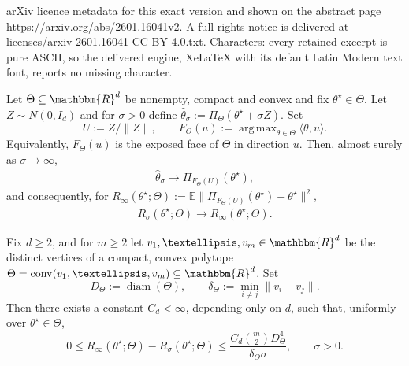 \documentclass[10pt,a4paper]{amsart}
\DeclareMathOperator*{\argmax}{arg\,max}
\newcommand{\E}{\mathbb{E}}
\newcommand{\R}{\mathbbm{R}}
\newcommand{\hattheta}{\hat{\theta}}
\begin{document}
arXiv licence metadata for this exact version and shown on the abstract page https://arxiv.org/abs/2601.16041v2. A full rights notice is delivered at licenses/arxiv-2601.16041-CC-BY-4.0.txt. Characters: every retained excerpt is pure ASCII, so the delivered engine, XeLaTeX with its default Latin Modern text font, reports no missing character.
\begin{theorem}\label{thm:large-sigma-projection}
Let $\Theta\subseteq\R^d$ be nonempty, compact and convex and fix $\theta^\star\in\Theta$.
Let $Z\sim N(0,I_d)$ and for $\sigma>0$ define $\hattheta_\sigma := \Pi_\Theta(\theta^\star+\sigma Z)$. Set
\[
U:=Z/\|Z\|,
\qquad
F_\Theta(u):=\argmax_{\theta\in\Theta}\langle \theta,u\rangle.
\]
Equivalently, $F_\Theta(u)$ is the exposed face of $\Theta$ in direction $u$. 
Then, almost surely as $\sigma\to\infty$,
\begin{align}\label{eq:large-sigma-a.s}
\hattheta_\sigma \to \Pi_{F_\Theta(U)}(\theta^\star),
\end{align}
and consequently, for $R_\infty(\theta^\star; \Theta) := \E\|\Pi_{F_\Theta(U)}(\theta^\star)-\theta^\star\|^2$,
\begin{align}
R_\sigma(\theta^\star; \Theta) \to R_\infty(\theta^\star; \Theta).
\label{eq:large-sigma-risk}
\end{align}
\end{theorem}

\begin{proposition}\label{prop:quant-diverging-noise-polytope}
Fix $d\ge2$, and for $m \ge 2$ let $v_1,\ldots,v_m\in\R^d$ be the distinct vertices of a compact, convex polytope $\Theta=\operatorname{conv}(v_1,\ldots,v_m)\subseteq\R^d$. Set
\[
    D_{\Theta}:=\operatorname{diam}(\Theta),
    \qquad
    \delta_\Theta:=\min_{i\neq j}\|v_i-v_j\|.
\]
Then there exists a constant $C_d<\infty$, depending only on $d$, such that, uniformly over $\theta^\star\in\Theta$,
\[
0
\le
R_\infty(\theta^\star;\Theta)-R_\sigma(\theta^\star;\Theta)
\le
\frac{
    C_d \binom{m}{2}D_\Theta^4
}{
    \delta_\Theta\sigma
},
\qquad \sigma>0.
\]
\end{proposition}
\end{document}
